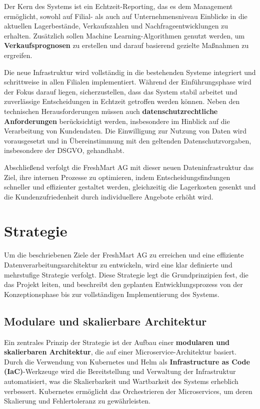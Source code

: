 \documentclass[%
pdftex,
oneside,			%
11pt,				%
parskip=half,		%
headheight = 12pt,	%
headsepline,		%
footsepline,		%
footheight = 16pt,	%
abstracton,		%
DIV=calc,		%
BCOR=8mm,		%
headinclude=false,	%
footinclude=false,	%
listof=totoc,		%
toc=bibliography,	%
]{scrreprt}	%
\begin{document}
    Der Kern des Systems ist ein Echtzeit-Reporting, das es dem Management ermöglicht, sowohl auf Filial- als auch auf Unternehmensniveau Einblicke in die aktuellen Lagerbestände, Verkaufszahlen und Nachfrageentwicklungen zu erhalten. 
    Zusätzlich sollen Machine Learning-Algorithmen genutzt werden, um \textbf{Verkaufsprognosen} zu erstellen und darauf basierend gezielte Maßnahmen zu ergreifen.

    Die neue Infrastruktur wird vollständig in die bestehenden Systeme integriert und schrittweise in allen Filialen implementiert. 
    Während der Einführungsphase wird der Fokus darauf liegen, sicherzustellen, dass das System stabil arbeitet und zuverlässige Entscheidungen in Echtzeit getroffen werden können. 
    Neben den technischen Herausforderungen müssen auch \textbf{datenschutzrechtliche Anforderungen} berücksichtigt werden, insbesondere im Hinblick auf die Verarbeitung von Kundendaten. 
    Die Einwilligung zur Nutzung von Daten wird vorausgesetzt und in Übereinstimmung mit den geltenden Datenschutzvorgaben, insbesondere der DSGVO, gehandhabt.

    Abschließend verfolgt die FreshMart AG mit dieser neuen Dateninfrastruktur das Ziel, ihre internen Prozesse zu optimieren, indem Entscheidungsfindungen schneller und effizienter gestaltet werden, gleichzeitig die Lagerkosten gesenkt und die Kundenzufriedenheit durch individuellere Angebote erhöht wird.

\section{Strategie}

    Um die beschriebenen Ziele der FreshMart AG zu erreichen und eine effiziente Datenverarbeitungsarchitektur zu entwickeln, wird eine klar definierte und mehrstufige Strategie verfolgt. 
    Diese Strategie legt die Grundprinzipien fest, die das Projekt leiten, und beschreibt den geplanten Entwicklungsprozess von der Konzeptionsphase bis zur vollständigen Implementierung des Systems.

    \subsection{Modulare und skalierbare Architektur}

        Ein zentrales Prinzip der Strategie ist der Aufbau einer \textbf{modularen und skalierbaren Architektur}, die auf einer Microservice-Architektur basiert. 
        Durch die Verwendung von Kubernetes und Helm als \textbf{Infrastructure as Code (IaC)}-Werkzeuge wird die Bereitstellung und Verwaltung der Infrastruktur automatisiert, was die Skalierbarkeit und Wartbarkeit des Systems erheblich verbessert. 
        Kubernetes ermöglicht das Orchestrieren der Microservices, um deren Skalierung und Fehlertoleranz zu gewährleisten. 
        
\end{document}

